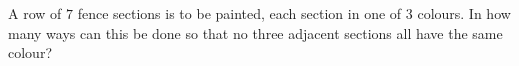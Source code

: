 A row of $7$ fence sections is to be painted, each section in one of $3$ colours. In how many ways can this be done so that no three adjacent sections all have the same colour?

